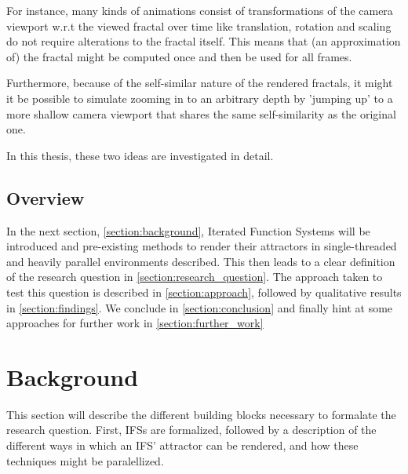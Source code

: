 \documentclass[11pt]{article}
\begin{document}
For instance, many kinds of animations consist of transformations of the camera viewport w.r.t the viewed fractal over time like translation, rotation and scaling do not require alterations to the fractal itself.
This means that (an approximation of) the fractal might be computed once and then be used for all frames.

Furthermore, because of the self-similar nature of the rendered fractals,
it might it be possible to simulate zooming in to an arbitrary depth by 'jumping up' to a more shallow camera viewport
that shares the same self-similarity as the original one.

In this thesis, these two ideas are investigated in detail.

\subsection{Overview}
\label{sec:org27169ba}

In the next section, \autoref{section:background}, Iterated Function Systems will be introduced and pre-existing methods to render their attractors in single-threaded and heavily parallel environments described.
This then leads to a clear definition of the research question in \autoref{section:research_question}.
The approach taken to test this question is described in \autoref{section:approach}, followed by qualitative results in \autoref{section:findings}.
We conclude in \autoref{section:conclusion} and finally hint at some approaches for further work in \autoref{section:further_work}


\section{Background}
\label{sec:org1dcb8fc}
\label{section:background}

This section will describe the different building blocks necessary to formalate the research question.
First, IFSs are formalized, followed by a description of the different ways in which an IFS' attractor can be rendered, 
and how these techniques might be paralellized.

\pagebreak
\end{document}
